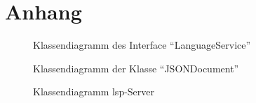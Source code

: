 \chapter{Anhang}\label{ch:appendix}

\begin{figure}[htp] %
    \centering
    \caption{Klassendiagramm des Interface ``LanguageService''}
    \label{fig:language-service-interface-defition}
\end{figure}

\vspace{0.5cm}

\begin{figure}[htp] %
    \centering
    \caption{Klassendiagramm der Klasse ``JSONDocument''}
    \label{fig:class-diagram-json-document}
\end{figure}

\begin{figure}[htp] %
    \centering
    \caption{Klassendiagramm \acs{lsp}-Server}
    \label{fig:class-diagram-lsp-Server}
\end{figure}
